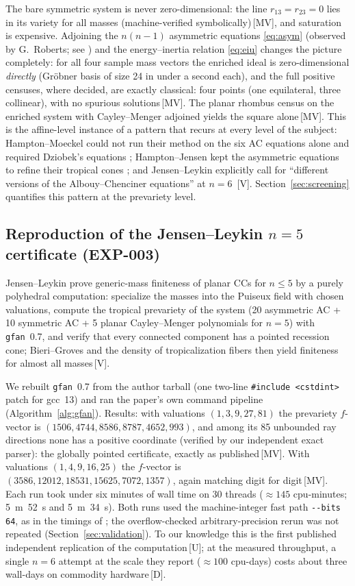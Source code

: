 \documentclass[11pt]{article}
\theoremstyle{definition}
\theoremstyle{remark}
\newcommand{\mk}[1]{\,{\scriptsize[#1]}}
\newcommand{\MV}{\mk{MV}}
\newcommand{\Dm}{\mk{D}}
\newcommand{\Vm}{\mk{V}}
\newcommand{\Um}{\mk{U}}
\begin{document}
The bare symmetric system is never zero-dimensional: the line
$r_{13}=r_{23}=0$ lies in its variety for all masses (machine-verified
symbolically)\MV, and saturation is expensive. Adjoining the $n(n-1)$ asymmetric
equations \eqref{eq:asym} (observed by
G.~Roberts; see \cite{HJ11,JL25}) and the energy--inertia relation \eqref{eq:eiu}
changes the picture completely: for all four sample mass vectors the enriched
ideal is zero-dimensional \emph{directly} (Gr\"obner basis of size 24 in under
a second each), and the full positive censuses, where decided, are exactly
classical: four points (one equilateral, three collinear), with no spurious
solutions\MV. The planar rhombus census on the enriched system with Cayley--Menger
adjoined yields the square alone\MV. This is the affine-level instance of a
pattern that recurs at every level of the subject: Hampton--Moeckel could not
run their method on the six AC equations alone and required Dziobek's
equations \cite{HM06}; Hampton--Jensen kept the asymmetric equations to refine
their tropical cones \cite{HJ11}; and Jensen--Leykin explicitly call for
``different versions of the Albouy--Chenciner equations'' at $n=6$ \cite{JL25}\Vm.
Section~\ref{sec:screening} quantifies this pattern at the prevariety level.

\subsection{Reproduction of the Jensen--Leykin \texorpdfstring{$n=5$}{n=5} certificate (EXP-003)}\label{sec:jl}

Jensen--Leykin \cite{JL25} prove generic-mass finiteness of planar CCs for
$n\le5$ by a purely polyhedral computation: specialize the masses into the
Puiseux field with chosen valuations, compute the tropical prevariety of the
system (20 asymmetric AC + 10 symmetric AC + 5 planar Cayley--Menger
polynomials for $n=5$) with \texttt{gfan}~0.7, and verify that every connected
component has a pointed recession cone; Bieri--Groves and the density of
tropicalization fibers then yield finiteness for almost all masses\Vm.

We rebuilt \texttt{gfan}~0.7 from the author tarball (one two-line
\texttt{\#include <cstdint>} patch for gcc~13) and ran the paper's own command pipeline
(Algorithm~\ref{alg:gfan}). Results: with valuations
$(1,3,9,27,81)$ the prevariety $f$-vector is
$(1506, 4744, 8586, 8787, 4652, 993)$, and among its 85 unbounded ray
directions none has a positive coordinate (verified by our independent exact
parser): the globally pointed certificate, exactly as published\MV. With
valuations $(1,4,9,16,25)$ the $f$-vector is
$(3586, 12012, 18531, 15625, 7072, 1357)$, again matching \cite{JL25} digit
for digit\MV. Each run took under six minutes of wall time on 30 threads
($\approx145$ cpu-minutes; 5~m~52~s and 5~m~34~s). Both runs used the machine-integer
fast path \texttt{-{}-bits 64}, as in the timings of \cite{JL25}; the overflow-checked
arbitrary-precision rerun was not repeated (Section~\ref{sec:validation}). To our knowledge this is
the first published independent replication of the \cite{JL25} computation\Um; at the measured
throughput, a single $n=6$ attempt at the scale they report ($\approx100$
cpu-days) costs about three wall-days on commodity hardware\Dm.
\end{document}

